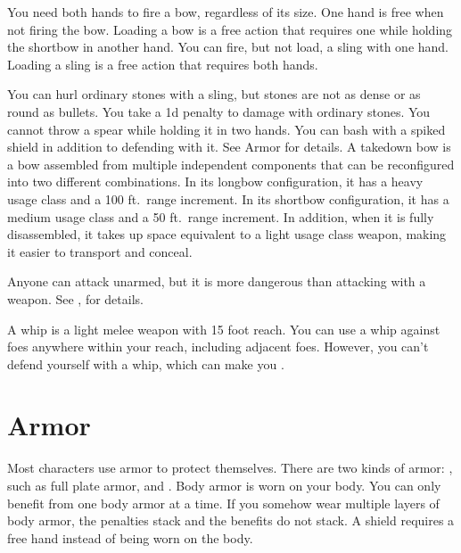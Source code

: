          You need both hands to fire a bow, regardless of its size. One hand is free when not firing the bow. Loading a bow is a free action that requires one  while holding the shortbow in another hand.
         You can fire, but not load, a sling with one hand. Loading a sling is a free action that requires both hands.
        \par You can hurl ordinary stones with a sling, but stones are not as dense or as round as bullets. You take a \minus1d penalty to damage with ordinary stones.
         You cannot throw a spear while holding it in two hands.
         You can bash with a spiked shield in addition to defending with it. See Armor for details.
         A takedown bow is a bow assembled from multiple independent components that can be reconfigured into two different combinations.
        In its longbow configuration, it has a heavy usage class and a 100 ft.\ range increment.
        In its shortbow configuration, it has a medium usage class and a 50 ft.\ range increment.
        In addition, when it is fully disassembled, it takes up space equivalent to a light usage class weapon, making it easier to transport and conceal.

         Anyone can attack unarmed, but it is more dangerous than attacking with a weapon. See , for details.

         A whip is a light melee weapon with 15 foot reach.
        You can use a whip against foes anywhere within your reach, including adjacent foes.
        However, you can't defend yourself with a whip, which can make you .

\section{Armor}\label{Armor}

    Most characters use armor to protect themselves. There are two kinds of armor: , such as full plate armor, and .
    Body armor is worn on your body.
    You can only benefit from one body armor at a time.
    If you somehow wear multiple layers of body armor, the penalties stack and the benefits do not stack.
    A shield requires a free hand instead of being worn on the body.

